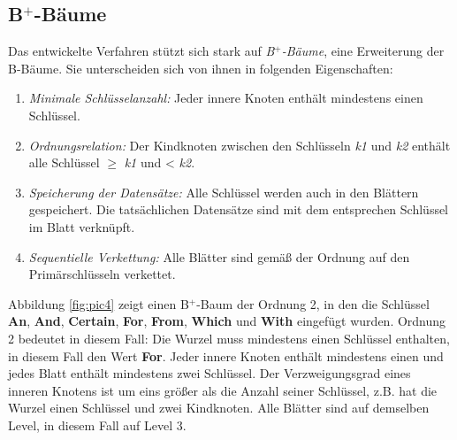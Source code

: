 \subsection{B$^+$-Bäume}\label{sec:b+bäume}
Das entwickelte Verfahren stützt sich stark auf \textit{B$^+$-Bäume}, eine Erweiterung der B-Bäume. Sie unterscheiden sich von ihnen in folgenden Eigenschaften: 
\begin{enumerate}
\setlength{\itemsep}{20pt}
	\item \textit{Minimale Schlüsselanzahl:} Jeder innere Knoten enthält mindestens einen Schlüssel.  
	\item \textit{Ordnungsrelation:} Der Kindknoten zwischen den Schlüsseln \textit{k1} und \textit{k2} enthält alle Schlüssel $\geq$ \textit{k1} und < \textit{k2}.
	\item \textit{Speicherung der Datensätze:} Alle Schlüssel werden auch in den Blättern gespeichert. Die tatsächlichen Datensätze sind mit dem entsprechen Schlüssel im Blatt verknüpft. 
	\item \textit{Sequentielle Verkettung:} Alle Blätter sind gemäß der Ordnung auf den Primärschlüsseln verkettet. 
\end{enumerate}
Abbildung \ref{fig:pic4} zeigt einen B$^+$-Baum der Ordnung 2, in den die Schlüssel \textbf{An}, \textbf{And}, \textbf{Certain}, \textbf{For}, \textbf{From}, \textbf{Which} und \textbf{With} eingefügt wurden. Ordnung 2 bedeutet in diesem Fall: Die Wurzel muss mindestens einen Schlüssel enthalten, in diesem Fall den Wert \textbf{For}. Jeder innere Knoten enthält mindestens einen und jedes Blatt enthält mindestens zwei Schlüssel. Der Verzweigungsgrad eines inneren Knotens ist um eins größer als die Anzahl seiner Schlüssel, z.B. hat die Wurzel einen Schlüssel und zwei Kindknoten. Alle Blätter sind auf demselben Level, in diesem Fall auf Level 3.

